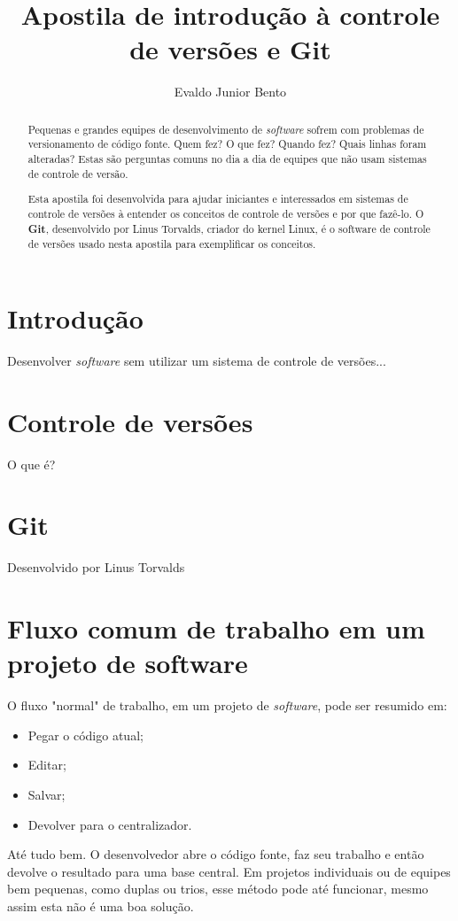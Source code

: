 \documentclass[12pt,a4paper]{report}
\begin{document}
\title{Apostila de introdução à controle de versões e Git}
\author{Evaldo Junior Bento}

\maketitle

\begin{abstract}
Pequenas e grandes equipes de desenvolvimento de \textit{software} sofrem
com problemas de versionamento de código fonte. Quem fez? O que fez? Quando
fez? Quais linhas foram alteradas? Estas são perguntas comuns no dia a dia de
equipes que não usam sistemas de controle de versão.

Esta apostila foi desenvolvida para ajudar iniciantes e interessados em
sistemas de controle de versões à entender os conceitos de controle de versões
e por que fazê-lo. O \textbf{Git}, desenvolvido por Linus Torvalds, criador do
kernel Linux, é o software de controle de versões usado nesta apostila para
exemplificar os conceitos.
\end{abstract}

\tableofcontents

\section{Introdução}
    Desenvolver \textit{software} sem utilizar um sistema de controle de versões...

\section{Controle de versões}
    O que é?

\section{Git}
    Desenvolvido por Linus Torvalds

\section{Fluxo comum de trabalho em um projeto de software}
    O fluxo "normal" de trabalho, em um projeto de \textit{software}, pode ser
    resumido em:
    \begin{itemize}
        \item Pegar o código atual;
        \item Editar;
        \item Salvar;
        \item Devolver para o centralizador.
    \end{itemize}
    Até tudo bem. O desenvolvedor abre o código fonte, faz seu trabalho e
    então devolve o resultado para uma base central. Em projetos individuais ou
    de equipes bem pequenas, como duplas ou trios, esse método pode até
    funcionar, mesmo assim esta não é uma boa solução.
    
\end{document}

